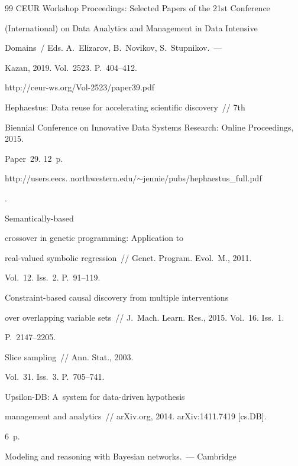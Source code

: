 {{\begin{thebibliography}{99}
CEUR Workshop Proceedings: Selected Papers of the 21st Conference 


(International) on Data Analytics and Management in Data Intensive 


Domains~/ Eds. A.~Elizarov, B.~Novikov, S.~Stupnikov.~---


Kazan,  2019. Vol.~2523. P.~404--412.


{\sf http://ceur-ws.org/Vol-2523/paper39.pdf}




 Hephaestus: Data reuse for accelerating scientific discovery~/\!\!/ 7th 


Biennial Conference on Innovative Data Systems Research: Online Proceedings, 2015. 


Paper~29. 12~p. {\sf 


http://users.eecs. northwestern.edu/$\sim$jennie/pubs/hephaestus\_full.pdf}.




 Semantically-based 


crossover in genetic programming: Application to 


real-valued symbolic regression~/\!\!/ Genet. Program. Evol.~M., 2011. 


Vol.~12. Iss.~2. P.~91--119.




 Constraint-based causal discovery from multiple interventions 


over overlapping variable sets~/\!\!/ J.~Mach. Learn. Res., 2015. Vol.~16. Iss.~1. 


P.~2147--2205.




 Slice sampling~/\!\!/ Ann. Stat., 2003. 


Vol.~31. Iss.~3. P.~705--741.




 Upsilon-DB: A~system for data-driven hypothesis 


management and analytics~/\!\!/ arXiv.org, 2014. arXiv:1411.7419 [cs.DB]. 


6~p.




 Modeling and reasoning with Bayesian networks.~--- Cambridge



\end{thebibliography}}}
